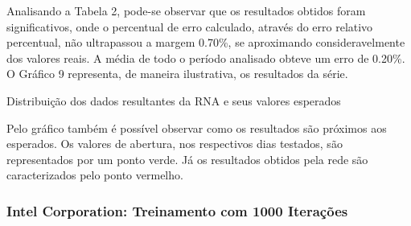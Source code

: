 Analisando a Tabela 2, pode-se observar que os resultados obtidos foram significativos, onde o percentual de erro calculado, através do erro relativo percentual, não ultrapassou a margem 0.70\%, se aproximando consideravelmente dos valores reais. A média de todo o período analisado obteve um erro de 0.20\%. O Gráfico 9 representa, de maneira ilustrativa, os resultados da série.
\begin{grafico}[h]
	\centering
	\caption{Distribuição dos dados resultantes da RNA e seus valores esperados}
	\label{lingua}
\end{grafico}

Pelo gráfico também é possível observar como os resultados são próximos aos esperados. Os valores de abertura, nos respectivos dias testados, são representados por um ponto verde. Já os resultados obtidos pela rede são caracterizados pelo ponto vermelho. 

\subsubsection{Intel Corporation: Treinamento com 1000 Iterações}	
